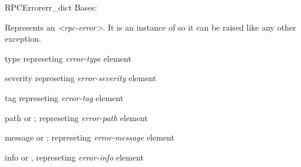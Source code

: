 \documentclass[a4paper,10pt,english]{manual}
\begin{document}
\hypertarget{ncclient.operations.rpc.RPCError}{}\begin{classdesc}{RPCError}{err\_dict}
Bases: 

Represents an \emph{\textless{}rpc-error\textgreater{}}. It is an instance of 
so it can be raised like any other exception.

\hypertarget{ncclient.operations.rpc.RPCError.type}{}\begin{memberdesc}{type}
\href{http://docs.python.org/library/string.html\#string}{} represeting \emph{error-type} element
\end{memberdesc}

\hypertarget{ncclient.operations.rpc.RPCError.severity}{}\begin{memberdesc}{severity}
\href{http://docs.python.org/library/string.html\#string}{} represeting \emph{error-severity} element
\end{memberdesc}

\hypertarget{ncclient.operations.rpc.RPCError.tag}{}\begin{memberdesc}{tag}
\href{http://docs.python.org/library/string.html\#string}{} represeting \emph{error-tag} element
\end{memberdesc}

\hypertarget{ncclient.operations.rpc.RPCError.path}{}\begin{memberdesc}{path}
\href{http://docs.python.org/library/string.html\#string}{} or \href{http://docs.python.org/library/constants.html\#None}{}; represeting \emph{error-path} element
\end{memberdesc}

\hypertarget{ncclient.operations.rpc.RPCError.message}{}\begin{memberdesc}{message}
\href{http://docs.python.org/library/string.html\#string}{} or \href{http://docs.python.org/library/constants.html\#None}{}; represeting \emph{error-message} element
\end{memberdesc}

\hypertarget{ncclient.operations.rpc.RPCError.info}{}\begin{memberdesc}{info}
\href{http://docs.python.org/library/string.html\#string}{} or \href{http://docs.python.org/library/constants.html\#None}{}, represeting \emph{error-info} element
\end{memberdesc}
\end{classdesc}
\end{document}
